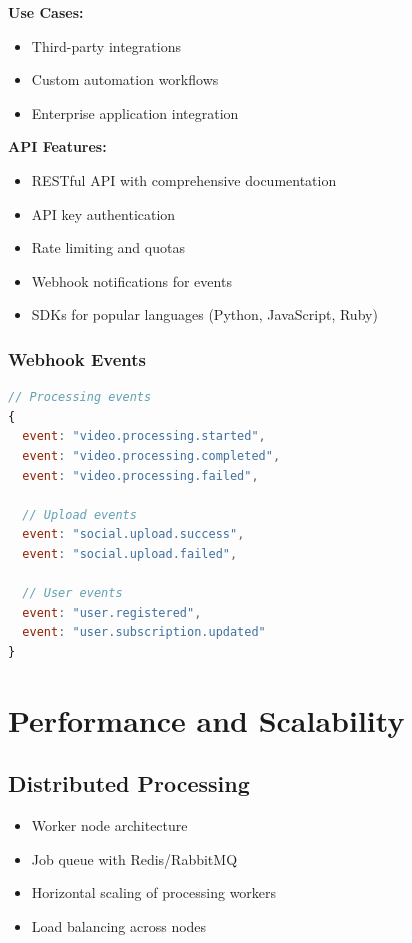 \textbf{Use Cases:}
\begin{itemize}
    \item Third-party integrations
    \item Custom automation workflows
    \item Enterprise application integration
\end{itemize}

\textbf{API Features:}
\begin{itemize}
    \item RESTful API with comprehensive documentation
    \item API key authentication
    \item Rate limiting and quotas
    \item Webhook notifications for events
    \item SDKs for popular languages (Python, JavaScript, Ruby)
\end{itemize}

\subsubsection{Webhook Events}

\begin{lstlisting}[language=JavaScript, caption=Webhook Event Types]
// Processing events
{
  event: "video.processing.started",
  event: "video.processing.completed",
  event: "video.processing.failed",
  
  // Upload events
  event: "social.upload.success",
  event: "social.upload.failed",
  
  // User events
  event: "user.registered",
  event: "user.subscription.updated"
}
\end{lstlisting}

\section{Performance and Scalability}

\subsection{Distributed Processing}

\begin{itemize}
    \item Worker node architecture
    \item Job queue with Redis/RabbitMQ
    \item Horizontal scaling of processing workers
    \item Load balancing across nodes
\end{itemize}

